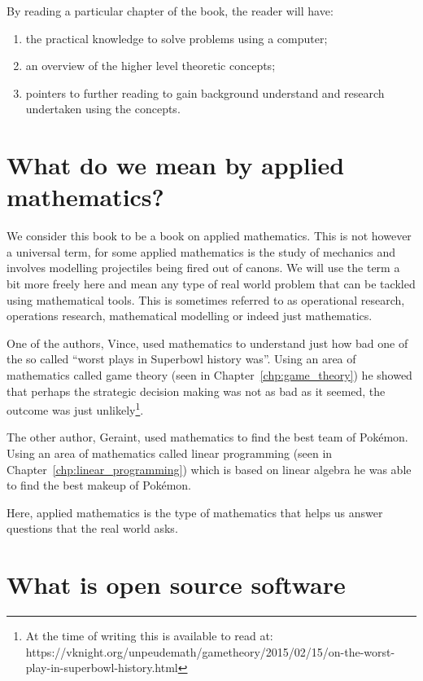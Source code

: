 By reading a particular chapter of the book, the reader will have:

\begin{enumerate}
  \item the practical knowledge to solve problems using a computer;
  \item an overview of the higher level theoretic concepts;
  \item pointers to further reading to gain background understand and research
        undertaken using the concepts.
\end{enumerate}

\section{What do we mean by applied mathematics?}\label{sec:what-do-we-mean-by-applied-mathematics}

We consider this book to be a book on applied mathematics. This is not
however a universal term, for some applied mathematics is the study of
mechanics and involves modelling projectiles being fired out of canons.
We will use the term a bit more freely here and mean any type of real
world problem that can be tackled using mathematical tools. This is
sometimes referred to as operational research, operations research,
mathematical modelling or indeed just mathematics.

One of the authors, Vince, used mathematics to understand just how bad one of
the so called ``worst plays in Superbowl history was''. Using an area of
mathematics called game theory (seen in Chapter~\ref{chp:game_theory}) he showed
that perhaps the strategic decision making was not as bad as it seemed, the
outcome was just unlikely\footnote{At the time of writing this is available to
read at:
https://vknight.org/unpeudemath/gametheory/2015/02/15/on-the-worst-play-in-superbowl-history.html}.

The other author, Geraint, used mathematics to find the best team of
Pokémon. Using an area of mathematics called linear programming (seen in
Chapter~\ref{chp:linear_programming}) which is
based on linear algebra he was able to find the best makeup of Pokémon.

Here, applied mathematics is the type of mathematics that helps us
answer questions that the real world asks.

\section{What is open source software}
\label{sec:what-is-open-source-software}

